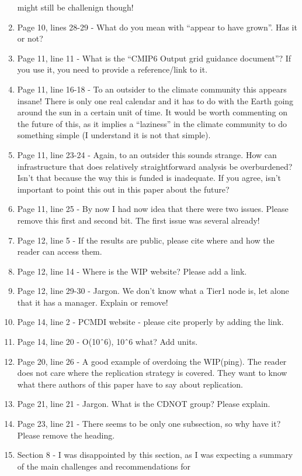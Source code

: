 \documentclass[gmd,manuscript]{copernicus}
\begin{document}
\begin{enumerate}[label=RC3-\arabic*,leftmargin=*]
  might still be challenign though!
\item Page 10, lines 28-29 - What do you mean with “appear to have
  grown”. Has it or not?
\item Page 11, line 11 - What is the “CMIP6 Output grid guidance
  document”? If you use it, you need to provide a reference/link to
  it.
\item Page 11, line 16-18 - To an outsider to the climate community
  this appears insane! There is only one real calendar and it has to
  do with the Earth going around the sun in a certain unit of time. It
  would be worth commenting on the future of this, as it implies a
  “laziness” in the climate community to do something simple (I
  understand it is not that simple).
\item Page 11, line 23-24 - Again, to an outsider this sounds strange.
  How can infrastructure that does relatively straightforward analysis
  be overburdened? Isn’t that because the way this is funded is
  inadequate. If you agree, isn’t important to point this out in this
  paper about the future?
\item Page 11, line 25 - By now I had now idea that there were two
  issues. Please remove this first and second bit. The first issue was
  several already!
\item Page 12, line 5 - If the results are public, please cite where
  and how the reader can access them.
\item Page 12, line 14 - Where is the WIP website? Please add a link.
\item Page 12, line 29-30 - Jargon. We don’t know what a Tier1 node
  is, let alone that it has a manager. Explain or remove!
\item Page 14, line 2 - PCMDI website - please cite properly by adding
  the link.
\item Page 14, line 20 - O(10ˆ6), 10ˆ6 what? Add units.
\item Page 20, line 26 - A good example of overdoing the WIP(ping).
  The reader does not care where the replication strategy is covered.
  They want to know what there authors of this paper have to say about
  replication.
\item Page 21, line 21 - Jargon. What is the CDNOT group? Please
  explain.
\item Page 23, line 21 - There seems to be only one subsection, so why
  have it? Please remove the heading.
\item Section 8 - I was disappointed by this section, as I was
  expecting a summary of the main challenges and recommendations for

\end{enumerate}
\end{document}
